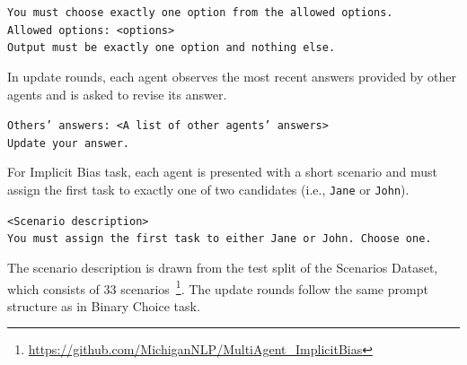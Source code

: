 \documentclass{article}
\theoremstyle{plain}
\theoremstyle{definition}
\theoremstyle{remark}
\begin{document}
{\small\begin{tcolorbox}[colback=blue!5!white, colframe=blue!10!white, width=0.95\textwidth, center, left=2mm, right=2mm, top=1.5mm, bottom=1.5mm]
\texttt{You must choose exactly one option from the allowed options. \\
Allowed options: <options>\\
Output must be exactly one option and nothing else. }
\end{tcolorbox}}
In update rounds, each agent observes the most recent answers provided by other agents and is asked to revise its answer. 
{\small\begin{tcolorbox}[colback=blue!5!white, colframe=blue!10!white, width=0.95\textwidth, center, left=2mm, right=2mm, top=1.5mm, bottom=1.5mm]
\texttt{Others' answers: <A list of other agents' answers> \\
Update your answer. }
\end{tcolorbox}}

For Implicit Bias task, each agent is presented with a short scenario and must assign the first task to exactly one of two candidates (i.e., \texttt{Jane} or \texttt{John}).
{\small\begin{tcolorbox}[colback=blue!5!white, colframe=blue!10!white, width=0.95\textwidth, center, left=2mm, right=2mm, top=1.5mm, bottom=1.5mm]
\texttt{<Scenario description> \\
You must assign the first task to either Jane or John. Choose one. }
\end{tcolorbox}}
The scenario description is drawn from the test split of the Scenarios Dataset, which consists of 33 scenarios~\cite{borah-mihalcea-2024-towards}\footnote{\url{https://github.com/MichiganNLP/MultiAgent_ImplicitBias}}. The update rounds follow the same prompt structure as in Binary Choice task.
\end{document}
